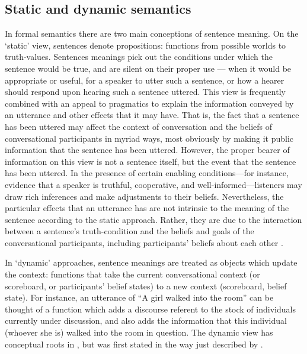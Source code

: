 \documentclass[12pt]{article}
\begin{document}



\subsection{Static and dynamic semantics}
In formal semantics there are two main conceptions of sentence meaning. On the `static' view, sentences denote propositions: functions from possible worlds to truth-values. Sentences meanings pick out the conditions under which the sentence would be true, and are silent on their proper use --- when it would be appropriate or useful, for a speaker to utter such a sentence, or how a hearer should respond upon hearing such a sentence uttered. This view is frequently combined with an appeal to pragmatics to explain the information conveyed by an utterance and other effects that it may have. That is, the fact that a sentence has been uttered may affect the context of conversation and the beliefs of conversational participants in myriad ways, most obviously by making it public information that the sentence has been uttered. However, the proper bearer of information on this view is not a sentence itself, but the event that the sentence has been uttered. In the presence of certain enabling conditions---for instance, evidence that a speaker is truthful, cooperative, and well-informed---listeners may draw rich inferences and make adjustments to their beliefs. Nevertheless, the particular effects that an utterance has are not intrinsic to the meaning of the sentence according to the static approach. Rather, they are due to the interaction between a sentence's truth-condition and the beliefs and goals of the conversational participants, including participants' beliefs about each other \citep[cf.]{grice89,stalnaker78,stalnaker02,clark96}.

In `dynamic' approaches, sentence meanings are treated as objects which update the context: functions that take the current conversational context (or scoreboard, or participants' belief states) to a new context (scoreboard, belief state). For instance, an utterance of ``A girl walked into the room'' can be thought of a function which adds a discourse referent to the stock of individuals currently under discussion, and also adds the information that this individual (whoever she is) walked into the room in question. The dynamic view has conceptual roots in \citet{karttunen69,stalnaker78,lewis79}, but was first stated in the way just described by \citet{heim82,kamp82}. 
\end{document}
